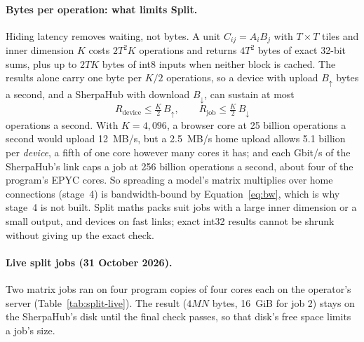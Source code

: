 \documentclass[11pt,a4paper]{article}
\theoremstyle{definition}
\theoremstyle{plain}
\begin{document}
\paragraph{Bytes per operation: what limits Split.} Hiding latency removes waiting, not bytes. A unit
$C_{ij}=A_iB_j$ with $T\times T$ tiles and inner dimension $K$ costs $2T^2K$ operations and returns $4T^2$ bytes
of exact 32-bit sums, plus up to $2TK$ bytes of int8 inputs when neither block is cached. The results alone carry
one byte per $K/2$ operations, so a device with upload $B_{\uparrow}$ bytes a second, and a SherpaHub with download $B_{\downarrow}$, can
sustain at most
\begin{equation}\label{eq:bw}
R_{\text{device}}\le \tfrac{K}{2}\,B_{\uparrow}, \qquad R_{\text{job}}\le \tfrac{K}{2}\,B_{\downarrow}
\end{equation}
operations a second. With $K=4{,}096$, a browser core at 25 billion operations a second would upload 12~MB/s, but
a 2.5~MB/s home upload allows 5.1 billion per \emph{device}, a fifth of one core however many cores it has; and
each Gbit/s of the SherpaHub's link caps a job at 256 billion operations a second, about four of the program's
EPYC cores. So spreading a model's matrix multiplies over home connections (stage~4) is bandwidth-bound by
Equation~\eqref{eq:bw}, which is why stage~4 is not built. Split maths packs suit jobs with a large inner dimension or a small output, and devices on fast links;
exact int32 results cannot be shrunk without giving up the exact check.

\paragraph{Live split jobs (31 October 2026).} Two matrix jobs ran on four program copies of four cores each on the operator's server (Table~\ref{tab:split-live}). The result ($4MN$ bytes, 16~GiB for job 2) stays on the SherpaHub's disk until the final check passes, so
that disk's free space limits a job's size.
\end{document}
